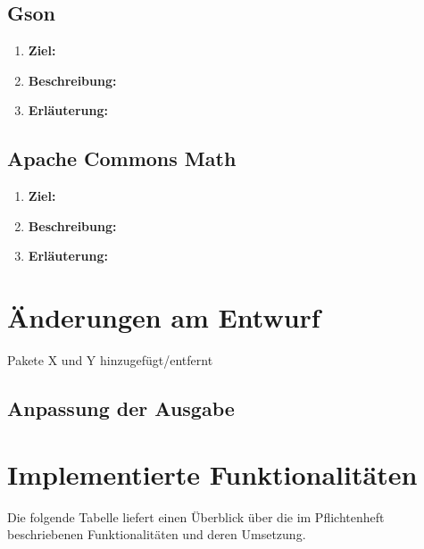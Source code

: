 \documentclass[parskip=full,11pt]{scrartcl}
\begin{document}
\subsection{Gson}
\begin{enumerate}
\item[] \textbf{Ziel:}
\item[] \textbf{Beschreibung:}
\item[] \textbf{Erläuterung:}
\end{enumerate}
\subsection{Apache Commons Math}
\begin{enumerate}
\item[] \textbf{Ziel:}
\item[] \textbf{Beschreibung:}
\item[] \textbf{Erläuterung:}
\end{enumerate}

\section{Änderungen am Entwurf}
Pakete X und Y hinzugefügt/entfernt
\subsection{Anpassung der Ausgabe}\label{outputmod}

\newpage
\section{Implementierte Funktionalitäten}
Die folgende Tabelle liefert einen Überblick über die im Pflichtenheft beschriebenen Funktionalitäten und deren Umsetzung.
\end{document}
